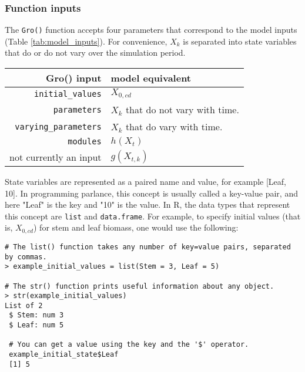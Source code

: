 \documentclass{article}
\newcommand{\code}[1]{\texttt{#1}}
\begin{document}
\subsubsection{Function inputs}

The \code{Gro()} function accepts four parameters that correspond to the model inputs (Table \ref{tab:model_inputs}). For convenience, $X_k$ is separated into state variables that do or do not vary over the simulation period.
% 
% 

\begin{table}[!htbp]
\begin{center}
\begin{tabular}{| r | l |}
	\hline
    \textbf{Gro() input} & \textbf{model equivalent} \\ 
    \hline
    \code{initial\_values} & $X_{0,cd}$ \\ 
    \code{parameters} & $X_k$ that do not vary with time. \\ 
    \code{varying\_parameters} & $X_k$ that do vary with time. \\ 
    \code{modules} & $h(X_{t})$ \\ 
    not currently an input & $g(X_{t,k})$ \\
    \hline
\end{tabular}
\end{center}
\end{table}

State variables are represented as a paired name and value, for example [Leaf, 10]. In programming parlance, this concept is usually called a key-value pair, and here "Leaf" is the key and "10" is the value.  In R, the data types that represent this concept are \code{list} and \code{data.frame}. For example, to specify initial values (that is, $X_{0,cd}$) for stem and leaf biomass, one would use the following:
\lstset{
  xleftmargin=0.05\textwidth, xrightmargin=.2\textwidth
}

\begin{center}
\begin{lstlisting}
# The list() function takes any number of key=value pairs, separated by commas.
> example_initial_values = list(Stem = 3, Leaf = 5)

# The str() function prints useful information about any object.
> str(example_initial_values)
List of 2
 $ Stem: num 3
 $ Leaf: num 5
 
 # You can get a value using the key and the '$' operator.
 example_initial_state$Leaf
 [1] 5
\end{lstlisting}
\end{center}
\end{document}
